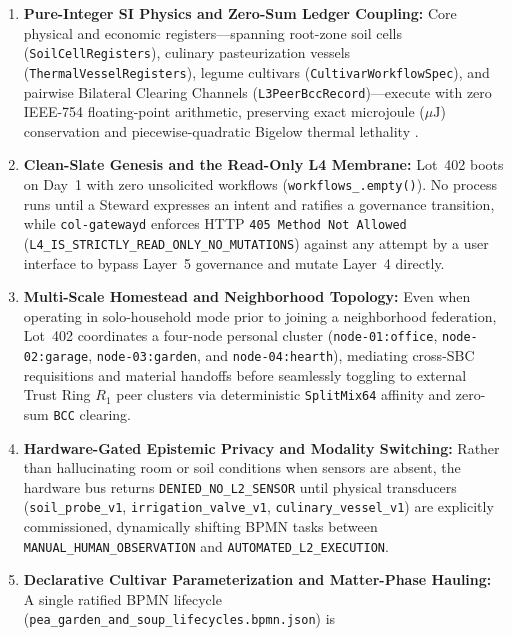 \begin{enumerate}
\item \textbf{Pure-Integer SI Physics and Zero-Sum Ledger Coupling:} Core physical and
        economic registers---spanning root-zone soil cells (\texttt{SoilCellRegisters}),
        culinary pasteurization vessels (\texttt{ThermalVesselRegisters}), legume cultivars
        (\texttt{CultivarWorkflowSpec}), and pairwise Bilateral Clearing Channels
        (\texttt{L3PeerBccRecord})---execute with zero IEEE-754 floating-point arithmetic,
        preserving exact microjoule ($\mu\mathrm{J}$) conservation and piecewise-quadratic
        Bigelow thermal lethality \parencite{bigelow1921thermal}.
\item \textbf{Clean-Slate Genesis and the Read-Only L4 Membrane:} Lot~402 boots on Day~1
        with zero unsolicited workflows (\texttt{workflows\_.empty()}). No process runs
        until a Steward expresses an intent and ratifies a governance transition, while
        \texttt{col-gatewayd} enforces HTTP \texttt{405 Method Not Allowed}
        (\texttt{L4\_IS\_STRICTLY\_READ\_ONLY\_NO\_MUTATIONS}) against any attempt by a user
        interface to bypass Layer~5 governance and mutate Layer~4 directly.
\item \textbf{Multi-Scale Homestead and Neighborhood Topology:} Even when operating in
        solo-household mode prior to joining a neighborhood federation, Lot~402 coordinates
        a four-node personal cluster (\texttt{node-01:office}, \texttt{node-02:garage},
        \texttt{node-03:garden}, and \texttt{node-04:hearth}), mediating cross-SBC
        requisitions and material handoffs before seamlessly toggling to external Trust Ring
        $R_1$ peer clusters via deterministic \texttt{SplitMix64} affinity and zero-sum
        \texttt{BCC} clearing.
\item \textbf{Hardware-Gated Epistemic Privacy and Modality Switching:} Rather than
        hallucinating room or soil conditions when sensors are absent, the hardware bus
        returns \texttt{DENIED\_NO\_L2\_SENSOR} until physical transducers
        (\texttt{soil\_probe\_v1}, \texttt{irrigation\_valve\_v1},
        \texttt{culinary\_vessel\_v1}) are explicitly commissioned, dynamically shifting
        BPMN tasks between \texttt{MANUAL\_HUMAN\_OBSERVATION} and
        \texttt{AUTOMATED\_L2\_EXECUTION}.
\item \textbf{Declarative Cultivar Parameterization and Matter-Phase Hauling:} A single
        ratified BPMN lifecycle (\texttt{pea\_garden\_and\_soup\_lifecycles.bpmn.json}) is

\end{enumerate}
